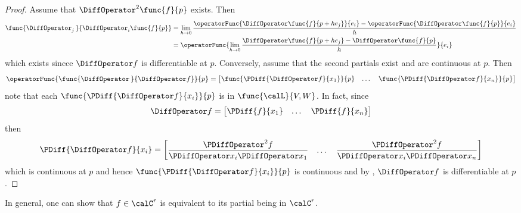 \begin{proof}
    Assume that \(\DiffOperator^2 \func{f}{p}\) exists. Then
    \begin{align*}
        \func{\DiffOperator_j \,}{\DiffOperator_i \func{f}{p}} & = \lim_{h \to 0} \dfrac{\operatorFunc{\DiffOperator \func{f}{p + he_j}}{e_i} - \operatorFunc{\DiffOperator \func{f}{p}}{e_i} }{h} \\
                                                               & = \operatorFunc{ \lim_{h \to 0} \dfrac{\DiffOperator \func{f}{p + he_j} - \DiffOperator \func{f}{p}}{h} }{e_i}
    \end{align*}
    which exists sincce \(\DiffOperator f\) is differentiable at \(p\). Conversely, assume that the second partials exist and are continuous at \(p\). Then
    \begin{equation*}
        \operatorFunc{\func{\DiffOperator \,}{\DiffOperator f}}{p} = \begin{bmatrix}
            \func{\PDiff{\DiffOperator f}{x_1}}{p} & \dots & \func{\PDiff{\DiffOperator f}{x_n}}{p}
        \end{bmatrix}
    \end{equation*}
    note that each \(\func{\PDiff{\DiffOperator f}{x_i}}{p}\) is in \(\func{\calL}{V,W}\). In fact, since
    \begin{equation*}
        \DiffOperator f = \begin{bmatrix}
            \PDiff{f}{x_1} & \dots & \PDiff{f}{x_n}
        \end{bmatrix}
    \end{equation*}
    then
    \begin{equation*}
        \PDiff{\DiffOperator f}{x_i} =  \begin{bmatrix}
            \dfrac{\PDiffOperator^2 f}{\PDiffOperator x_i \PDiffOperator x_1} & \dots & \dfrac{\PDiffOperator^2 f}{\PDiffOperator x_i \PDiffOperator x_n}
        \end{bmatrix}
    \end{equation*}
    which is continuous at \(p\) and hence \(\func{\PDiff{\DiffOperator f}{x_i}}{p}\) is continuous and by , \(\DiffOperator f\) is differentiable at \(p\).
\end{proof}

\begin{remark}
    In general, one can show that \(f \in \calC^r\) is equivalent to its partial being in \(\calC^r\).
\end{remark}

